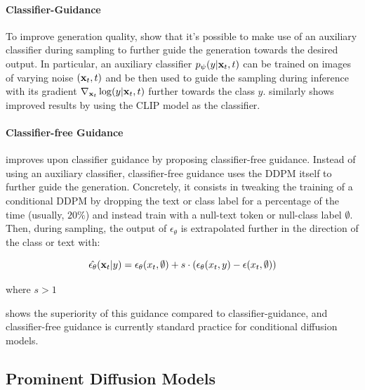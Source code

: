 \paragraph{Classifier-Guidance}
To improve generation quality, \cite{sohl2015deep, song2020score, dhariwal2021diffusion} show that 
it's possible to make use of an auxiliary classifier
during sampling to further guide the generation towards the desired output. 
In particular, an auxiliary classifier $p_\psi(y|\mathbf{x}_t, t)$ can be trained on images of varying noise 
$(\mathbf{x}_t, t)$ 
and be then used to guide the sampling during inference with its gradient 
 $\nabla_{\mathbf{x}_t} \log(y|\mathbf{x}_t, t) $ further towards the class $y$. 
 \cite{nichol2021glide} similarly shows improved results by using the CLIP \citep{radford2021learning}
 model as the classifier.

\paragraph{Classifier-free Guidance}
\cite{ho2022classifierfree} improves upon classifier guidance by 
proposing classifier-free guidance. Instead of using an auxiliary classifier, 
classifier-free guidance uses the \ac{DDPM} itself to further guide the 
generation. Concretely, it consists in tweaking the training of a conditional \ac{DDPM} 
by dropping the text or class label for a percentage of the time (usually, $20\%$)
and instead train with a null-text token or null-class label $\emptyset$. Then, during 
sampling, the output of $\epsilon_\theta$ is extrapolated further in the direction 
of the class or text with:

\begin{equation}
      \hat{\epsilon_\theta}(\mathbf{x}_t|y) = \epsilon_\theta(x_t, \emptyset) + s \cdot (\epsilon_\theta(x_t, y) - \epsilon(x_t, \emptyset))
\end{equation}

\noindent where $s > 1$

\cite{nichol2021glide} shows the superiority of this guidance compared to classifier-guidance,
and classifier-free guidance is currently standard practice for conditional diffusion models.

\subsection{Prominent Diffusion Models}

